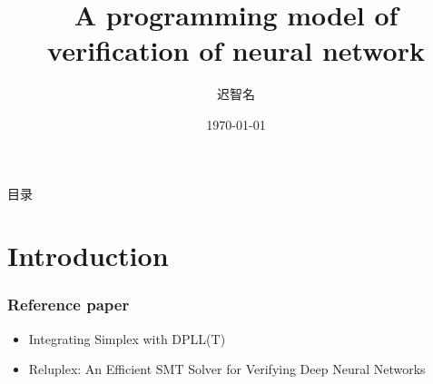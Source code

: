 \documentclass[aspectratio=169%
,serif,mathserif]{beamer}
\begin{document}
\title{A programming model of verification of neural network } %
\author[Chi~Zhiming]{迟智名} %
\institute[ISCAS] %
{	
}
	\CTEXoptions[today=old]
	\date{\today} %
\begin{frame}[plain]\vspace{1.5em}
\titlepage\vspace{-0.5cm}
\end{frame}
\begin{frame}{目录}
\tableofcontents
\end{frame}

\section{Introduction} %

\begin{frame}
	\frametitle{Reference paper}
	\begin{itemize}
		\item Integrating Simplex with DPLL(T)
		\item Reluplex: An Efficient SMT Solver for Verifying Deep Neural Networks
	\end{itemize}
\end{frame}
\end{document}
